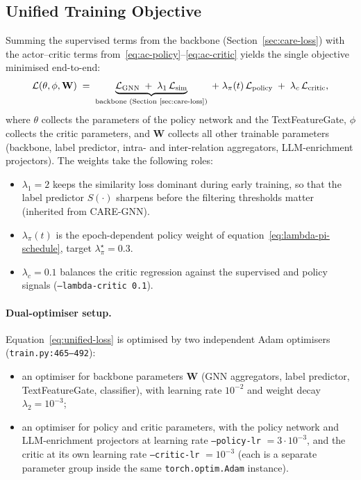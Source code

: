 \subsection{Unified Training Objective}
\label{sec:unified-loss}

Summing the supervised terms from the backbone (Section~\ref{sec:care-loss}) with the actor--critic terms from~\eqref{eq:ac-policy}--\eqref{eq:ac-critic} yields the single objective minimised end-to-end:
\begin{equation}
    \mathcal{L}(\theta, \phi, \mathbf{W})
    \;=\;
    \underbrace{\mathcal{L}_{\text{GNN}} \;+\; \lambda_1\, \mathcal{L}_{\text{sim}}}_{\text{backbone (Section~\ref{sec:care-loss})}}
    \;+\;
    \lambda_\pi(t)\, \mathcal{L}_{\text{policy}}
    \;+\;
    \lambda_c\, \mathcal{L}_{\text{critic}},
    \label{eq:unified-loss}
\end{equation}
where $\theta$ collects the parameters of the policy network and the TextFeatureGate, $\phi$ collects the critic parameters, and $\mathbf{W}$ collects all other trainable parameters (backbone, label predictor, intra- and inter-relation aggregators, LLM-enrichment projectors). The weights take the following roles:

\begin{itemize}
    \item $\lambda_1 = 2$ keeps the similarity loss dominant during early training, so that the label predictor $S(\cdot)$ sharpens before the filtering thresholds matter (inherited from CARE-GNN).
    \item $\lambda_\pi(t)$ is the epoch-dependent policy weight of equation~\eqref{eq:lambda-pi-schedule}, target $\lambda_\pi^{\star} = 0.3$.
    \item $\lambda_c = 0.1$ balances the critic regression against the supervised and policy signals (\texttt{--lambda-critic 0.1}).
\end{itemize}

\paragraph{Dual-optimiser setup.} Equation~\eqref{eq:unified-loss} is optimised by two independent Adam optimisers (\texttt{train.py:465--492}):

\begin{itemize}
    \item an optimiser for backbone parameters $\mathbf{W}$ (GNN aggregators, label predictor, TextFeatureGate, classifier), with learning rate $10^{-2}$ and weight decay $\lambda_2 = 10^{-3}$;
    \item an optimiser for policy and critic parameters, with the policy network and LLM-enrichment projectors at learning rate \texttt{--policy-lr} $= 3 \cdot 10^{-3}$, and the critic at its own learning rate \texttt{--critic-lr} $= 10^{-3}$ (each is a separate parameter group inside the same \texttt{torch.optim.Adam} instance).
\end{itemize}


